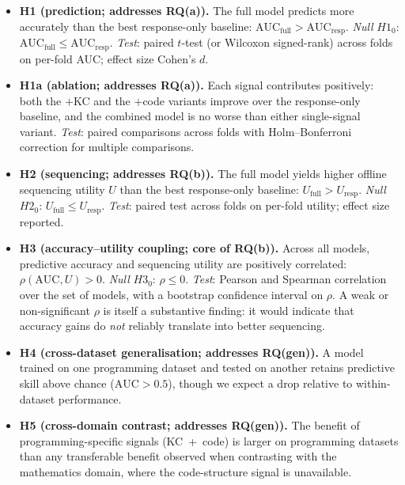 \begin{itemize}
  \item \textbf{H1 (prediction; addresses RQ(a)).}
        The full model predicts more accurately than the best
        response-only baseline:
        $\mathrm{AUC}_{\text{full}} > \mathrm{AUC}_{\text{resp}}$.
        \textit{Null} $H1_0$: $\mathrm{AUC}_{\text{full}} \leq
        \mathrm{AUC}_{\text{resp}}$.
        \textit{Test}: paired $t$-test (or Wilcoxon signed-rank) across
        folds on per-fold AUC; effect size Cohen's $d$.

  \item \textbf{H1a (ablation; addresses RQ(a)).}
        Each signal contributes positively: both the $+$KC and the
        $+$code variants improve over the response-only baseline, and the
        combined model is no worse than either single-signal variant.
        \textit{Test}: paired comparisons across folds with
        Holm--Bonferroni correction for multiple comparisons.

  \item \textbf{H2 (sequencing; addresses RQ(b)).}
        The full model yields higher offline sequencing utility
        $U$ than the best response-only baseline:
        $U_{\text{full}} > U_{\text{resp}}$.
        \textit{Null} $H2_0$: $U_{\text{full}} \leq U_{\text{resp}}$.
        \textit{Test}: paired test across folds on per-fold utility;
        effect size reported.

  \item \textbf{H3 (accuracy--utility coupling; core of RQ(b)).}
        Across all models, predictive accuracy and sequencing utility are
        positively correlated:
        $\rho(\mathrm{AUC}, U) > 0$.
        \textit{Null} $H3_0$: $\rho \leq 0$.
        \textit{Test}: Pearson and Spearman correlation over the set of
        models, with a bootstrap confidence interval on $\rho$.
        A weak or non-significant $\rho$ is itself a substantive
        finding: it would indicate that accuracy gains do \emph{not}
        reliably translate into better sequencing.

  \item \textbf{H4 (cross-dataset generalisation; addresses RQ(gen)).}
        A model trained on one programming dataset and tested on another
        retains predictive skill above chance
        ($\mathrm{AUC} > 0.5$), though we expect a drop relative to
        within-dataset performance.

  \item \textbf{H5 (cross-domain contrast; addresses RQ(gen)).}
        The benefit of programming-specific signals (KC~+~code) is larger
        on programming datasets than any transferable benefit observed
        when contrasting with the mathematics domain, where the
        code-structure signal is unavailable.
\end{itemize}

